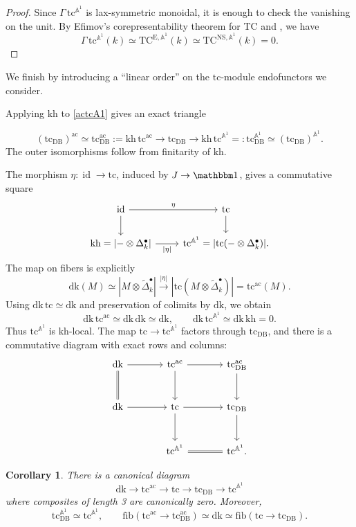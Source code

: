\documentclass{amsart}
\theoremstyle{plain}
\newtheorem{corollary}[prop]{Corollary}
\theoremstyle{definition}
\newcommand{\bbA}{\mathbb{A}}
\newcommand{\TC}{\mathrm{TC}}
\newcommand{\fib}{\mathrm{fib}}
\newcommand{\dk}{\mathrm{dk}}
\newcommand{\kh}{\mathrm{kh}}
\newcommand{\tc}{\mathrm{tc}}
\DeclareMathOperator{\id}{id}
\newcommand{\DB}{\mathrm{DB}}
\newcommand{\NS}{\mathrm{NS}}
\begin{document}
\begin{proof}

Since $\Gamma\,\tc^{\bbA^1}$ is lax-symmetric monoidal, it is enough to check the vanishing on the unit.
By Efimov's corepresentability theorem for TC and \cite{Elm20}, we have
\[
\Gamma\,\tc^{\bbA^1}(k)\simeq \TC^{\mathrm{E},\bbA^1}(k)\simeq \TC^{\NS,\bbA^1}(k)=0.
\]
\end{proof}

We finish by introducing a ``linear order'' on the
    $\tc$-module endofunctors we consider.

Applying $\kh$ to \eqref{actcA1} gives an exact triangle

\[
(\tc_{\DB})^{\mathrm{ac}}\simeq \tc_{\DB}^{\mathrm{ac}}:=\kh\,\tc^{\mathrm{ac}}
\longrightarrow \tc_{\DB}\longrightarrow
\kh\,\tc^{\bbA^1}=:\tc_{\DB}^{\bbA^1}\simeq (\tc_{\DB})^{\bbA^1}.
\]
The outer isomorphisms follow from finitarity of $\kh$.

The morphism $\eta:\id\to \tc$, induced by $J\to\mathbbm1$, gives a commutative square
\[
\begin{tikzcd}
\id\arrow[r,"\eta"]\arrow[d]&\tc\arrow[d]\\
\kh=|{-}\otimes\Delta_k^\bullet|
\arrow[r,"|\eta|"']&\tc^{\bbA^1}=|\tc({-}\otimes\Delta_k^\bullet)|.
\end{tikzcd}
\]
The map on fibers is explicitly
\begin{equation}\label{dktotcac}
\dk(M)\simeq|M\otimes\widetilde\Delta_k^\bullet|
\xrightarrow{|\eta|}
|\tc(M\otimes\widetilde\Delta_k^\bullet)|=\tc^{\mathrm{ac}}(M).
\end{equation}
Using $\dk\,\tc\simeq \dk$ and preservation of colimits by $\dk$, we obtain
\[
\dk\,\tc^{\mathrm{ac}}\simeq \dk\,\dk\simeq \dk,
\qquad \dk\,\tc^{\bbA^1}\simeq \dk\,\kh=0.
\]
Thus $\tc^{\bbA^1}$ is $\kh$-local. The map
$\tc\to \tc^{\bbA^1}$ factors through $\tc_{\DB}$, and there is a commutative diagram with exact rows and columns:
\begin{equation}\label{acDBdiagram}
\begin{tikzcd}[column sep=large,row sep=large]
\dk\arrow[r]\arrow[d,equal]&\tc^{\mathrm{ac}}\arrow[r]\arrow[d]
  &\tc_{\DB}^{\mathrm{ac}}\arrow[d]\\
\dk\arrow[r]&\tc\arrow[r]\arrow[d]&\tc_{\DB}\arrow[d]\\
&\tc^{\bbA^1}\arrow[r,equal]&\tc^{\bbA^1}.
\end{tikzcd}
\end{equation}

\begin{corollary}\label{acyclicDBcorollary}
There is a canonical diagram
\[
\dk\longrightarrow \tc^{\mathrm{ac}}\longrightarrow \tc
\longrightarrow \tc_{\DB}\longrightarrow \tc^{\bbA^1}
\]
where composites of length 3 are canonically zero.
Moreover,
\[
\tc_{\DB}^{\bbA^1}\simeq \tc^{\bbA^1},\qquad
\fib(\tc^{\mathrm{ac}}\to \tc_{\DB}^{\mathrm{ac}})
\simeq \dk\simeq\fib(\tc\to \tc_{\DB}).
\]
\end{corollary}
\end{document}
